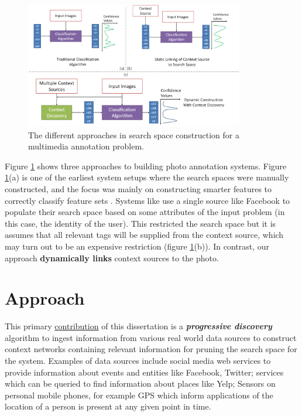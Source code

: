 \begin{figure}[t]
\centering
\includegraphics[width=0.85\textwidth]{media/with-without-cuenet-2.png}
\caption{The different approaches in search space construction for a multimedia annotation problem.}
\label{fig:with-without-cuenet}
\end{figure}

Figure \ref{fig:with-without-cuenet} shows three approaches to building photo annotation systems. Figure \ref{fig:with-without-cuenet}(a) is one of the earliest system setups where the search spaces were manually constructed, and the focus was mainly on constructing smarter features to correctly classify feature sets \cite{turk1991eigenfaces, belhumeur1997eigenfaces}. Systems like \cite{stone2008autotagging} use a single source like Facebook to populate their search space based on some attributes of the input problem (in this case, the identity of the user). This restricted the search space but it is assumes that all relevant tags will be supplied from the context source, which may turn out to be an expensive restriction (figure \ref{fig:with-without-cuenet}(b)). In contrast, our approach \textbf{dynamically links} context sources to the photo.

\section{Approach}
This primary \uline{contribution} of this dissertation is a \textbf{\textit{progressive discovery}} algorithm to ingest information from various real world data sources to construct context networks containing relevant information for pruning the search space for the system. Examples of data sources include social media web services to provide information about events and entities like Facebook, Twitter; services which can be queried to find information about places like Yelp; Sensors on personal mobile phones, for example GPS which inform applications of the location of a person is present at any given point in time.

